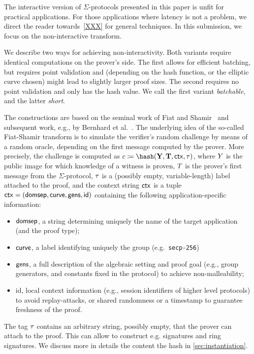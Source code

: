 \documentclass[runningheads]{llncs}
\begin{document}
\begin{remark}
The interactive version of $\Sigma$-protocols presented in this paper is unfit for practical applications. For those applications where latency is not a problem, we direct the reader towards~\cref{XXX} for general techniques. In this submission, we focus on the non-interactive transform.
\end{remark}


We describe two ways for achieving non-interactivity. Both variants require identical computations on the prover's side.
The first allows for efficient batching, but requires point validation and (depending on the hash function, or the elliptic curve chosen) might lead to
slightly larger proof sizes. The second requires no point validation and only has the hash value.
We call the first variant \emph{batchable}, and the latter \emph{short}.

The constructions are based on the seminal work of Fiat and Shamir~\cite{C:FiaSha86} and subsequent work, e.g., by Bernhard et al.~\cite{AC:BerPerWar12}.
The underlying idea of the so-called Fiat-Shamir transform is to simulate the verifier's random challenge by means of a random oracle, depending on the first message computed by the prover.
More precisely, the challenge is computed as
$c\defeq\hash(\vec \statement,\vec \commitment, \ctx, \stag)$,
where $Y$ is the public image for which knowledge of a witness is proven, $T$ is the prover's first message from the $\Sigma$-protocol, $\tau$ is a (possibly empty, variable-length) label attached to the proof, and
the context string $\mathsf{ctx}$ is a tuple $\mathsf{ctx} = (\textsf{domsep}, \textsf{curve}, \textsf{gens}, \textsf{id})$ containing the following application-specific information:
\begin{itemize}
  \item $\textsf{domsep}$, a string determining uniquely the name of the target application (and the proof type);
  \item $\textsf{curve}$, a label identifying uniquely the group (e.g.\ \verb|secp-256|)
  \item $\textsf{gens}$,
    a full description of the algebraic setting and proof goal (e.g., group generators, and constants fixed in the protocol) to achieve non-malleability;
  \item \textsf{id},
    local context information (e.g., session identifiers of higher level protocols) to avoid replay-attacks, or shared randomness or a timestamp to guarantee freshness of the proof.
\end{itemize}
The tag $\tau$ contains an arbitrary string, possibly empty, that the prover can attach to the proof. This can allow to construct e.g. signatures and ring signatures.
We discuss more in details the content the hash in \cref{sec:instantiation}.
\end{document}
